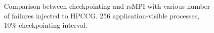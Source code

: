 \begin{figure}[!t]
  \begin{center}
  \end{center}
  \vskip -0.2in
  \caption{Comparison between checkpointing and rsMPI with various number of failures injected to HPCCG. 256 application-visible processes, 10\% checkpointing interval.}
  \label{fig:multiple_failure}
  \vskip -0.25in
\end{figure}



